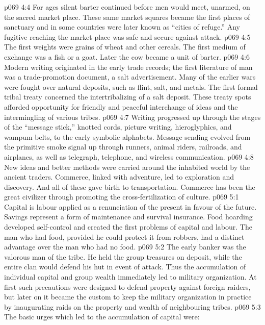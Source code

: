 \vs p069 4:4 For ages silent barter continued before men would meet, unarmed, on the sacred market place. These same market squares became the first places of sanctuary and in some countries were later known as “cities of refuge.” Any fugitive reaching the market place was safe and secure against attack.
\vs p069 4:5 \pc The first weights were grains of wheat and other cereals. The first medium of exchange was a fish or a goat. Later the cow became a unit of barter.
\vs p069 4:6 Modern writing originated in the early trade records; the first literature of man was a trade\hyp{}promotion document, a salt advertisement. Many of the earlier wars were fought over natural deposits, such as flint, salt, and metals. The first formal tribal treaty concerned the intertribalizing of a salt deposit. These treaty spots afforded opportunity for friendly and peaceful interchange of ideas and the intermingling of various tribes.
\vs p069 4:7 Writing progressed up through the stages of the “message stick,” knotted cords, picture writing, hieroglyphics, and wampum belts, to the early symbolic alphabets. Message sending evolved from the primitive smoke signal up through runners, animal riders, railroads, and airplanes, as well as telegraph, telephone, and wireless communication.
\vs p069 4:8 New ideas and better methods were carried around the inhabited world by the ancient traders. Commerce, linked with adventure, led to exploration and discovery. And all of these gave birth to transportation. Commerce has been the great civilizer through promoting the cross\hyp{}fertilization of culture.
\vs p069 5:1 Capital is labour applied as a renunciation of the present in favour of the future. Savings represent a form of maintenance and survival insurance. Food hoarding developed self\hyp{}control and created the first problems of capital and labour. The man who had food, provided he could protect it from robbers, had a distinct advantage over the man who had no food.
\vs p069 5:2 The early banker was the valorous man of the tribe. He held the group treasures on deposit, while the entire clan would defend his hut in event of attack. Thus the accumulation of individual capital and group wealth immediately led to military organization. At first such precautions were designed to defend property against foreign raiders, but later on it became the custom to keep the military organization in practice by inaugurating raids on the property and wealth of neighbouring tribes.
\vs p069 5:3 The basic urges which led to the accumulation of capital were:
